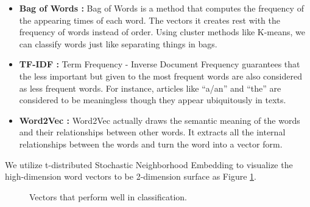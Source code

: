 \documentclass[12pt]{article}%
\begin{document}
\begin{itemize} 
	\item  \textbf{Bag of Words \cite{BOW, BOW2}:} Bag of Words is a method that computes the frequency of the appearing times of each word. The vectors it creates rest with the frequency of words instead of order. Using cluster methods like K-means, we can classify words just like separating things in bags.
	\item  \textbf{TF-IDF \cite{TF} :} Term Frequency - Inverse Document Frequency guarantees that the less important but given to the most frequent words are also considered as less frequent words. For instance, articles like “a/an” and “the” are considered to be meaningless though they appear ubiquitously in texts. 
	
	\item  \textbf{Word2Vec \cite{word,word2,word3}:} Word2Vec actually draws the semantic meaning of the words and their relationships between other words. It extracts all the internal relationships between the words and turn the word into a vector form.
	
\end{itemize}
We utilize t-distributed Stochastic Neighborhood Embedding\cite{t} to visualize the high-dimension word vectors to be 2-dimension surface as Figure \ref{fig}.
\begin{figure}[H]
	\centering
	\caption{ Vectors that perform well in classification.}
	\label{fig}
\end{figure}
\end{document}
